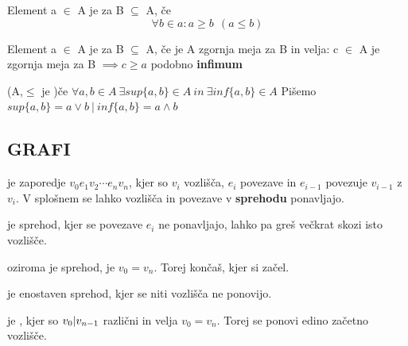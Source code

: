 \begin{slajd}
    {Element a $\in$ A je  za B $\subseteq$ A, če }{ \[ \forall b\in a: a \geq b \ \ (a \leq b) \]}
\end{slajd}

\begin{slajd}
    {Element a $\in$ A je  za B $\subseteq$ A, če }{ je A zgornja meja za B in velja: \break
    c $\in$ A je zgornja meja za B $\implies c \geq a$ \bigbreak podobno \textbf{infimum} }
\end{slajd}

\begin{slajd}
    {(A,$\leq$ je )}{če $\forall a,b \in A \ \exists sup\{a,b\} \in A \ in \ \exists inf\{a,b\} \in A$ \break Pišemo $sup\{a,b\}=a\vee b \ | \ inf\{a,b\}=a\wedge b$}
\end{slajd}


\subsection{GRAFI}
\begin{frame}
    \subsectionpage
\end{frame}

\begin{slajd}
    {}{je zaporedje $v_0e_1v_2\cdots e_nv_n$, kjer so $v_i$ vozlišča, $e_i$ povezave in $e_{i-1}$ povezuje $v_{i-1}$ z $v_i$.
    \break V splošnem se lahko vozlišča in povezave v \textbf{sprehodu} ponavljajo.}
\end{slajd}


\begin{slajd}
    {}{je sprehod, kjer se povezave $e_i$ ne ponavljajo, lahko pa greš večkrat skozi isto vozlišče.}
\end{slajd}


\begin{slajd}
    {}{oziroma  je sprehod, je $v_0 = v_n$. Torej končaš, kjer si začel.}
\end{slajd}


\begin{slajd}
    {}{je enostaven sprehod, kjer se niti vozlišča ne ponovijo.}
\end{slajd}


\begin{slajd}
    {}{je , kjer so $v_0 \arrowvert v_{n-1}$ različni in velja $v_0 = v_n$. Torej se ponovi edino začetno vozlišče.}
\end{slajd}

